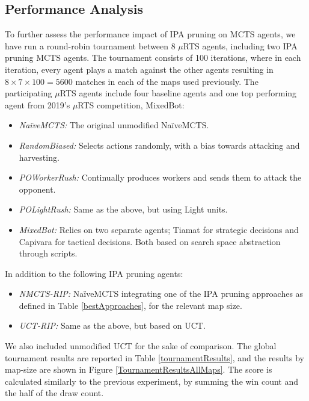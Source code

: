 \documentclass[conference]{IEEEtran}
\newcommand{\mRTS}{$\mu$RTS}
\begin{document}

\subsection{Performance Analysis}

To further assess the performance impact of IPA pruning on MCTS agents, we have run a round-robin tournament between 8 \mRTS{} agents, including two IPA pruning MCTS agents. The tournament consists of 100 iterations, where in each iteration, every agent plays a match against the other agents resulting in $8\times7\times100 = 5600$ matches in each of the maps used previously. The participating \mRTS{} agents include four baseline agents and one top performing agent from 2019's \mRTS{} competition, MixedBot: %

\begin{itemize}
\item \textit{NaïveMCTS:} The original unmodified NaïveMCTS.
\item \textit{RandomBiased:} Selects actions randomly, with a bias towards attacking and harvesting.
\item \textit{POWorkerRush:} Continually produces workers and sends them to attack the opponent.
\item \textit{POLightRush:} Same as the above, but using Light units.
\item \textit{MixedBot:} Relies on two separate agents; Tiamat\cite{marino_evolving_2018} for strategic decisions and Capivara\cite{moraes_action_2018} for tactical decisions. Both based on search space abstraction through scripts.
\end{itemize}

In addition to the following IPA pruning agents:

\begin{itemize}
\item \textit{NMCTS-RIP:} NaïveMCTS integrating one of the IPA pruning approaches as defined in Table \ref{bestApproaches}, for the relevant map size.
\item \textit{UCT-RIP:} Same as the above, but based on UCT.
\end{itemize}

We also included unmodified UCT for the sake of comparison. The global tournament results are reported in Table \ref{tournamentResults}, and the results by map-size are shown in Figure \ref{TournamentResultsAllMaps}. The score is calculated similarly to the previous experiment, by summing the win count and the half of the draw count.
\end{document}
